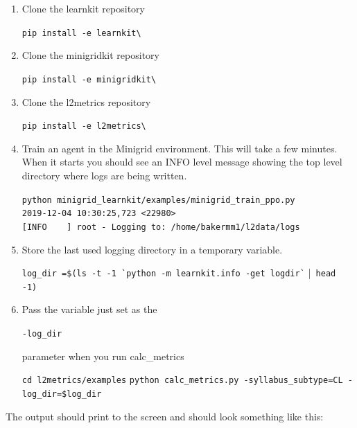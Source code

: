 \begin{enumerate}

\item Clone the learnkit repository\\
\begin{small}
\verb|pip install -e learnkit\|\\[0.1in]
\end{small}

\item Clone the minigridkit repository\\
\begin{small}
\verb|pip install -e minigridkit\|\\[0.1in]
\end{small}

\item Clone the l2metrics repository\\
\begin{small}
\verb|pip install -e l2metrics\|\\[0.1in]
\end{small}

\item Train an agent in the Minigrid environment. This will take a few minutes. When it starts you should see an INFO level message showing the top level directory where logs are being written.\\[0.1in]
\begin{small}
\verb|python minigrid_learnkit/examples/minigrid_train_ppo.py| \\
\verb|2019-12-04 10:30:25,723 <22980> | \\
\verb|[INFO    ] root - Logging to: /home/bakermm1/l2data/logs|\\[0.1in]
\end{small}

\item Store the last used logging directory in a temporary variable.\\
\begin{small}
\verb|log_dir =$(ls -t -1 `python -m learnkit.info -get logdir`| |\verb| head -1)|\\[0.1in]
\end{small}
\item Pass the variable just set as the 
\begin{small}
\verb|-log_dir|
\end{small}parameter when you run calc\_metrics\\
\begin{small}
\verb|cd l2metrics/examples|
\verb|python calc_metrics.py -syllabus_subtype=CL -log_dir=$log_dir|\\[0.2in]
\end{small}
\end{enumerate}
The output should print to the screen and should look something like this:\\[0.2in]

